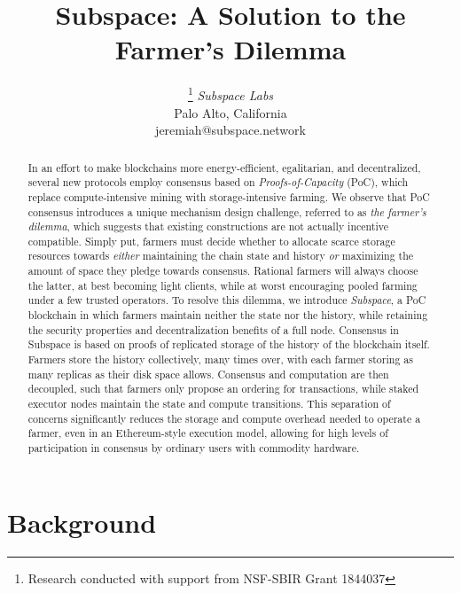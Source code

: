 \documentclass[conference]{IEEEtran}
\begin{document}
\title{Subspace: A Solution to the Farmer's Dilemma}

\author{
\thanks{Research conducted with support from NSF-SBIR Grant 1844037}
\textit{Subspace Labs}\\
Palo Alto, California \\
jeremiah@subspace.network
}

\maketitle

\begin{abstract}
In an effort to make blockchains more energy-efficient, egalitarian, and decentralized, several new protocols employ consensus based on \textit{Proofs-of-Capacity} (PoC), which replace compute-intensive mining with storage-intensive farming. We observe that PoC consensus introduces a unique mechanism design challenge, referred to as \textit{the farmer’s dilemma}, which suggests that existing constructions are not actually incentive compatible. Simply put, farmers must decide whether to allocate scarce storage resources towards \textit{either} maintaining the chain state and history \textit{or} maximizing the amount of space they pledge towards consensus. Rational farmers will always choose the latter, at best becoming light clients, while at worst encouraging pooled farming under a few trusted operators. To resolve this dilemma, we introduce \textit{Subspace}, a PoC blockchain in which farmers maintain neither the state nor the history, while retaining the security properties and decentralization benefits of a full node. Consensus in Subspace is based on proofs of replicated storage of the history of the blockchain itself. Farmers store the history collectively, many times over, with each farmer storing as many replicas as their disk space allows. Consensus and computation are then decoupled, such that farmers only propose an ordering for transactions, while staked executor nodes maintain the state and compute transitions. This separation of concerns significantly reduces the storage and compute overhead needed to operate a farmer, even in an Ethereum-style execution model, allowing for high levels of participation in consensus by ordinary users with commodity hardware.

\end{abstract}

\section{Background}
\end{document}
